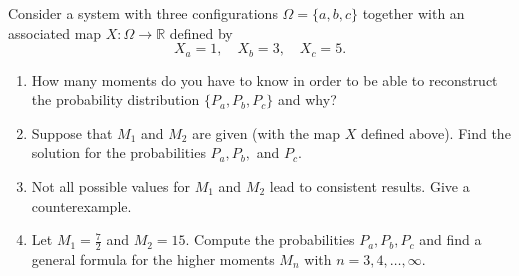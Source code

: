 \begin{Problem}
	Consider a system with three configurations $\Omega = \{a,b,c\}$ together with an associated map $X : \Omega \to \mathbb{R}$ defined by
	\[
	X_a = 1, \quad X_b = 3, \quad X_c = 5.
	\]
	
	\begin{enumerate}
		\item[(a)] How many moments do you have to know in order to be able to reconstruct the probability distribution $\{P_a, P_b, P_c\}$ and why?
		\item[(b)] Suppose that $M_1$ and $M_2$ are given (with the map $X$ defined above). Find the solution for the probabilities $P_a, P_b,$ and $P_c$.
		\item[(c)] Not all possible values for $M_1$ and $M_2$ lead to consistent results. Give a counterexample.
		\item[(d)] Let $M_1 = \tfrac{7}{2}$ and $M_2 = 15$. Compute the probabilities $P_a, P_b, P_c$ and find a general formula for the higher moments $M_n$ with $n = 3,4,\dots,\infty$.
	\end{enumerate}
\end{Problem}
